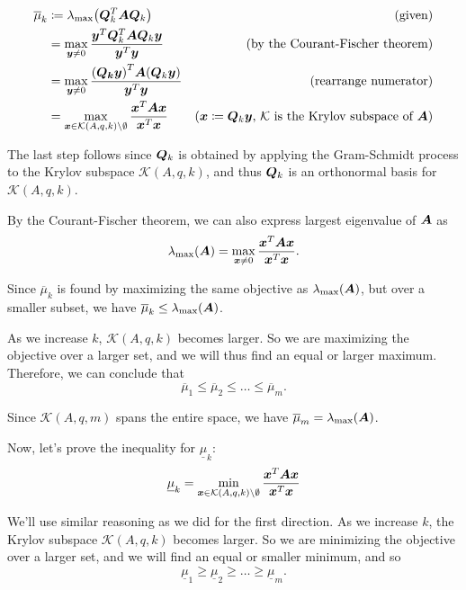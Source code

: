 \documentclass[twoside,10pt]{article}
\begin{document}
\begin{align*}
  \overline{\mu}_k &\coloneqq \lambda_{\max} \left(\mtx{Q}_k^T \mtx{A} \mtx{Q}_k\right)&\text{(given)}\\
  &= \max\limits_{\vct{y} \neq 0}\dfrac{\vct{y}^T\mtx{Q}_k^T \mtx{A}\mtx{Q}_k\vct{y}}{\vct{y}^T\vct{y}}&\text{(by the Courant-Fischer theorem)}\\
  &= \max\limits_{\vct{y} \neq 0}\dfrac{\left(\mtx{Q_k}\vct{y}\right)^T \mtx{A}\left(\mtx{Q}_k\vct{y}\right)}{\vct{y}^T\vct{y}}&\text{(rearrange numerator)}\\
  &= \max\limits_{\vct{x} \in \mathcal{K}(A,q,k) \setminus \emptyset}\dfrac{\vct{x}^T \mtx{A}\vct{x}}{\vct{x}^T\vct{x}}&\text{($\vct{x} \coloneqq \mtx{Q}_k\vct{y}$, $\mathcal{K}$ is the Krylov subspace of $\mtx{A}$)}\\
\end{align*}

The last step follows since $\bm{Q}_k$ is obtained by applying the Gram-Schmidt process to the Krylov subspace $\mathcal{K}(A,q,k)$, and thus $\bm{Q}_k$ is an orthonormal basis for $\mathcal{K}(A,q,k)$.

By the Courant-Fischer theorem, we can also express largest eigenvalue of $\bm{A}$ as
$$\lambda_{\max} \left(\mtx{A}\right) = \max\limits_{\vct{x} \neq 0}\dfrac{\vct{x}^T\mtx{A}\vct{x}}{\vct{x}^T\vct{x}}.$$

Since $\overline{\mu}_k$ is found by maximizing the same objective as $\lambda_{\max} \left(\mtx{A}\right)$, but over a smaller subset, we have $\overline{\mu}_k \leq \lambda_{\max} \left(\mtx{A}\right)$.

As we increase $k$, $\mathcal{K}(A,q,k)$ becomes larger.
So we are maximizing the objective over a larger set, and we will thus find an equal or larger maximum.
Therefore, we can conclude that
$$\overline{\mu}_{1} \leq \overline{\mu}_{2} \leq \dots \leq \overline{\mu}_m.$$

Since $\mathcal{K}(A,q,m)$ spans the entire space, we have $\overline{\mu}_m = \lambda_{\max} \left(\mtx{A}\right)$.

Now, let's prove the inequality for $\underline{\mu}_k$:
$$\underline{\mu}_k = \min\limits_{\bm{x} \in \mathcal{K}(A,q,k) \setminus \emptyset}\dfrac{\bm{x}^T \bm{A}\bm{x}}{\bm{x}^T\bm{x}}$$

We'll use similar reasoning as we did for the first direction.
As we increase $k$, the Krylov subspace $\mathcal{K}(A,q,k)$ becomes larger.
So we are minimizing the objective over a larger set, and we will find an equal or smaller minimum, and so
$$\underline{\mu}_{1} \geq \underline{\mu}_{2} \geq \dots \geq \underline{\mu}_m.$$
\end{document}
